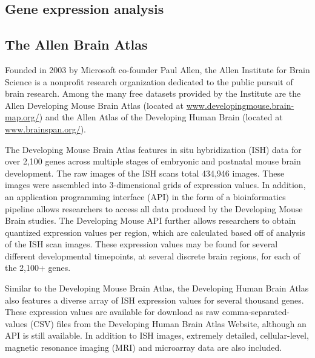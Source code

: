 \documentclass[12pt,oneside,onecolumn,a4paper]{article}
\begin{document}
\subsection{Gene expression analysis}


\subsection{The Allen Brain Atlas}
Founded in 2003 by Microsoft co-founder Paul Allen, the Allen Institute for Brain Science is a nonprofit research organization dedicated to the public pursuit of brain research. Among the many free datasets provided by the Institute are the Allen Developing Mouse Brain Atlas (located at \href{http://www.developingmouse.brain-map.org/}{www.developingmouse.brain-map.org/}) and the Allen Atlas of the Developing Human Brain (located at \href{http://www.brainspan.org/}{www.brainspan.org/}).

The Developing Mouse Brain Atlas features in situ hybridization (ISH) data for over 2,100 genes across multiple stages of embryonic and postnatal mouse brain development. The raw images of the ISH scans total 434,946 images. These images were assembled into 3-dimensional grids of expression values.  In addition, an application programming interface (API) in the form of a bioinformatics pipeline allows researchers to access all data produced by the Developing Mouse Brain studies. The Developing Mouse API further allows researchers to obtain quantized expression values per region, which are calculated based off of analysis of the ISH scan images. These expression values may be found for several different developmental timepoints, at several discrete brain regions, for each of the 2,100+ genes. \citep{Thompson_2014}

Similar to the Developing Mouse Brain Atlas, the Developing Human Brain Atlas also features a diverse array of ISH expression values for several thousand genes. These expression values are available for download as raw comma-separated-values (CSV) files from the Developing Human Brain Atlas Website, although an API is still available. In addition to ISH images, extremely detailed, cellular-level, magnetic resonance imaging (MRI) and microarray data are also included. \citep{24695229}
\end{document}
